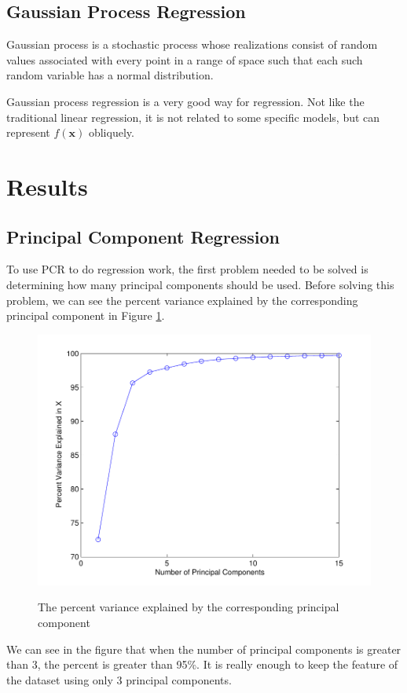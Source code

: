 \documentclass[a4paper]{article}
\newcommand{\bfx}{\mathbf{x}}
\begin{document}
\subsection{Gaussian Process Regression}
Gaussian process \cite{rasmussen2006gaussian} is a stochastic process whose realizations consist of random values associated with every point in a range of space such that each such random variable has a normal distribution. 

Gaussian process regression is a very good way for regression. Not like the traditional linear regression, it is not related to some specific models, but can represent $f(\bfx)$ obliquely.

\newpage
\section{Results}
\subsection{Principal Component Regression}
To use PCR to do regression work, the first problem needed to be solved is determining how many principal components should be used. Before solving this problem, we can see the percent variance explained by the corresponding principal component in Figure \ref{pcrb1}.
\begin{figure}[h]
  \centering
  \includegraphics[width=.6\textwidth]{images/explain_PCR.pdf}\\
  \caption{The percent variance explained by the corresponding principal component}\label{pcrb1}
\end{figure}

We can see in the figure that when the number of principal components is greater than 3, the percent is greater than 95\%. It is really enough to keep the feature of the dataset using only 3 principal components.
\end{document}

